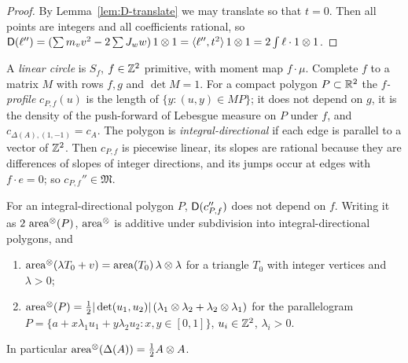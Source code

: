\documentclass[11pt]{amsart}
\begin{document}
\begin{proof}
By Lemma~\ref{lem:D-translate} we may translate so that $t=0$. Then all points are integers and all coefficients
rational, so $\mathsf{D}(\ell'')=(\sum m_vv^2-2\sum J_ww)\,1\otimes1=\langle\ell'',t^2\rangle\,1\otimes1=2\int\ell\cdot1\otimes1$.
\end{proof}

A \emph{linear circle} is $S_f$, $f\in\mathbb{Z}^2$ primitive, with moment map $f\cdot\mu$. Complete $f$ to a matrix $M$
with rows $f,g$ and $\det M=1$. For a compact polygon $P\subset\mathbb{R}^2$ the \emph{$f$-profile} $c_{P,f}(u)$ is the
length of $\{y:(u,y)\in MP\}$; it does not depend on $g$, it is the density of the push-forward of Lebesgue measure on
$P$ under $f$, and $c_{\Delta(A),(1,-1)}=c_A$. The polygon is \emph{integral-directional} if each edge is parallel
to a vector of $\mathbb{Z}^2$. Then $c_{P,f}$ is piecewise linear, its slopes are rational because they are differences of
slopes of integer directions, and its jumps occur at edges with $f\cdot e=0$; so $c_{P,f}''\in\mathfrak M$.

\begin{lemma}\label{lem:tensor-area}
For an integral-directional polygon $P$, $\mathsf{D}(c''_{P,f})$ does not depend on $f$. Writing it as $2\,\operatorname{area}^\otimes(P)$,
$\operatorname{area}^\otimes$ is additive under subdivision into integral-directional polygons, and
\begin{enumerate}[label=(\alph*),leftmargin=2em]
\item $\operatorname{area}^\otimes(\lambda T_0+v)=\operatorname{area}(T_0)\,\lambda\otimes\lambda$ for a triangle $T_0$ with integer vertices and
  $\lambda>0$;
\item $\operatorname{area}^\otimes(P)=\frac12|\det(u_1,u_2)|\,(\lambda_1\otimes\lambda_2+\lambda_2\otimes\lambda_1)$ for the
  parallelogram $P=\{a+x\lambda_1u_1+y\lambda_2u_2:x,y\in[0,1]\}$, $u_i\in\mathbb{Z}^2$, $\lambda_i>0$.
\end{enumerate}
In particular $\operatorname{area}^\otimes(\Delta(A))=\frac12A\otimes A$.
\end{lemma}
\end{document}
